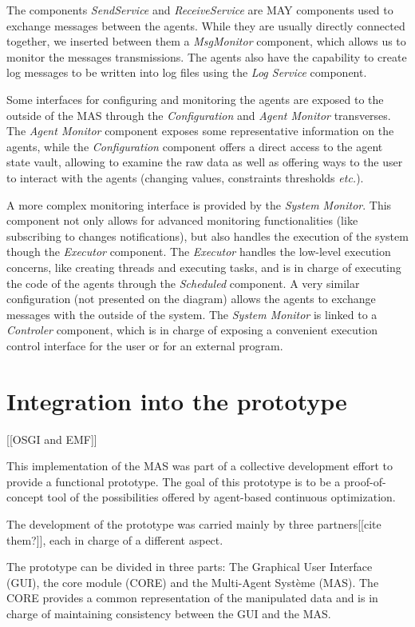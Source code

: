 The components \emph{SendService} and \emph{ReceiveService} are MAY components used to exchange messages between the agents. While they are usually directly connected together, we inserted between them a \emph{MsgMonitor} component, which allows us to monitor the messages transmissions. The agents also have the capability to create log messages to be written into log files using the \emph{Log Service} component.

Some interfaces for configuring and monitoring the agents are exposed to the outside of the MAS through the \emph{Configuration} and \emph{Agent Monitor} transverses. The \emph{Agent Monitor} component exposes some representative information on the agents, while the \emph{Configuration} component offers a direct access to the agent state vault, allowing to examine the raw data as well as offering ways to the user to interact with the agents (changing values, constraints thresholds \emph{etc.}).

A more complex monitoring interface is provided by the \emph{System Monitor}. This component not only allows for advanced monitoring functionalities (like subscribing to changes notifications), but also handles the execution of the system though the \emph{Executor} component. The \emph{Executor} handles the low-level execution concerns, like creating threads and executing tasks, and is in charge of executing the code of the agents through the \emph{Scheduled} component. A very similar configuration (not presented on the diagram) allows the agents to exchange messages with the outside of the system. The \emph{System Monitor} is linked to a \emph{Controler} component, which is in charge of exposing a convenient execution control interface for the user or for an external program.

\section{Integration into the prototype}

[[OSGI and EMF]]

This implementation of the MAS was part of a collective development effort to provide a functional prototype. The goal of this prototype is to be a proof-of-concept tool of the possibilities offered by agent-based continuous optimization.

The development of the prototype was carried mainly by three partners[[cite them?]], each in charge of a different aspect.

The prototype can be divided in three parts: The Graphical User Interface (GUI), the core module (CORE) and the Multi-Agent Système (MAS). The CORE provides a common representation of the manipulated data and is in charge of maintaining consistency between the GUI and the MAS.

